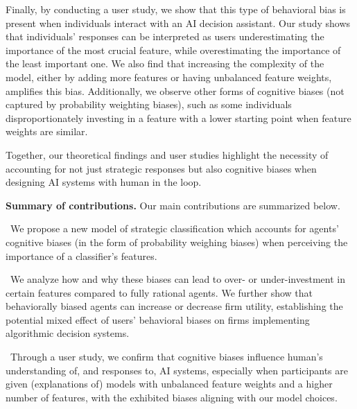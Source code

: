 Finally, by conducting a user study, we show that this type of behavioral bias is present when individuals interact with an AI decision assistant. Our study shows that individuals' responses can be interpreted as users underestimating the importance of the most crucial feature, while overestimating the importance of the least important one. We also find that increasing the complexity of the model, either by adding more features or having unbalanced feature weights, amplifies this bias. Additionally, we observe other forms of cognitive biases (not captured by probability weighting biases), such as some individuals disproportionately investing in a feature with a lower starting point when feature weights are similar.

Together, our theoretical findings and user studies highlight the necessity of accounting for not just strategic responses but also cognitive biases when designing AI systems with human in the loop. 

\textbf{Summary of contributions.} Our main contributions are summarized below.

\textbullet\, We propose a new model of strategic classification which accounts for agents' cognitive biases (in the form of probability weighing biases) when perceiving the importance of a classifier's features.

\textbullet\, We analyze how and why these biases can lead to over- or under-investment in certain features compared to fully rational agents. We further show that behaviorally biased agents can increase or decrease firm utility, establishing the potential mixed effect of users' behavioral biases on firms implementing algorithmic decision systems.

\textbullet\, Through a user study, we confirm that cognitive biases influence human's understanding of, and responses to, AI systems, especially when participants are given (explanations of) models with unbalanced feature weights and a higher number of features, with the exhibited biases aligning with our model choices.

